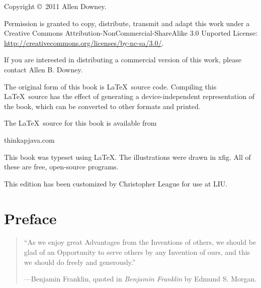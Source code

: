 \documentclass[12pt]{book}
\theoremstyle{definition}
\begin{document}
\begin{latexonly}
\begin{flushright}
\vfill

\end{flushright}


\pagebreak
\thispagestyle{empty}

Copyright \copyright ~2011 Allen Downey.

\vspace{0.25in}

Permission is granted to copy, distribute, transmit and adapt
this work under a Creative Commons 
Attribution-NonCommercial-ShareAlike 3.0 Unported License:
\url{http://creativecommons.org/licenses/by-nc-sa/3.0/}.

If you are interested in distributing a commercial version of this
work, please contact Allen B. Downey.

The original form of this book is \LaTeX\ source code.  Compiling this
\LaTeX\ source has the effect of generating a device-independent
representation of the book, which can be converted to other formats
and printed.

The \LaTeX\ source for this book is available from

\begin{verbatimtab}
      thinkapjava.com
\end{verbatimtab}

This book was typeset using \LaTeX .  The illustrations were
drawn in xfig.  All of these are free, open-source programs.

This edition has been customized by Christopher League for use at LIU.


\vspace{0.25in}



\end{latexonly}

\fi

\setcounter{chapter}{0}
\chapter*{Preface}

\begin{quote}
``As we enjoy great Advantages from the Inventions of others,
we should be glad of an Opportunity to serve others by any
Invention of ours, and this we should do freely and generously.''

---Benjamin Franklin, quoted in {\em Benjamin Franklin} by
Edmund S. Morgan.
\end{quote}
\end{document}
